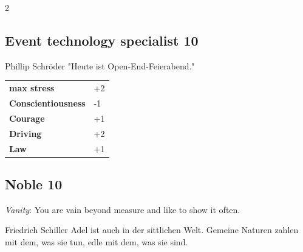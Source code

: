 \begin{multicols}{2}
\begin{tcolorbox}

\end{tcolorbox}

\begin{tcolorbox}
    \subsection*{Event technology specialist \hfill \small{10 }}
    \tcblower


\begin{pquote}{Phillip Schröder}
"Heute ist Open-End-Feierabend."
\end{pquote}

\vspace{3mm}

\begin{tabular}{@{}ll@{}}
    \textbf{max stress} & +2\\
    \textbf{Conscientiousness} & -1\\
    \textbf{Courage} & +1\\
    \textbf{Driving} & +2\\
    \textbf{Law} & +1\\
\end{tabular}


\end{tcolorbox}

\begin{tcolorbox}
    \subsection*{Noble \hfill \small{10 }}
    \tcblower
\textit{Vanity}: You are vain beyond measure and like to show it often.

\begin{pquote}{Friedrich Schiller}
Adel ist auch in der sittlichen Welt. Gemeine Naturen zahlen mit dem, was sie tun, edle mit dem, was sie sind.
\end{pquote}


\end{tcolorbox}
\end{multicols}
